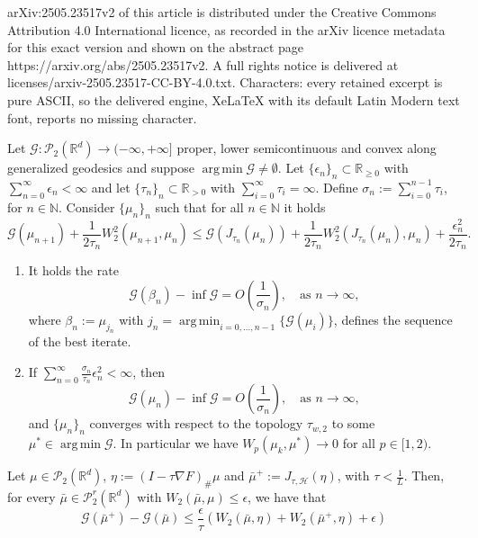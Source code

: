 \documentclass[10pt,a4paper]{amsart}
\DeclareMathOperator*{\argmin}{arg\,min}
\newcommand{\N}{\mathbb{N}}
\newcommand{\RR}{(-\infty,+\infty]}
\newcommand{\R}{\mathbb{R}}
\newcommand{\cG}{\mathcal{G}}
\newcommand{\cP}{\mathcal{P}}
\begin{document}
arXiv:2505.23517v2 of this article is distributed under the Creative Commons Attribution 4.0 International licence, as recorded in the arXiv licence metadata for this exact version and shown on the abstract page https://arxiv.org/abs/2505.23517v2. A full rights notice is delivered at licenses/arxiv-2505.23517-CC-BY-4.0.txt. Characters: every retained excerpt is pure ASCII, so the delivered engine, XeLaTeX with its default Latin Modern text font, reports no missing character.
\begin{theorem}\label{thm:second_error_choice}
	Let $\cG : \cP_2(\R^d) \to \RR $ proper, lower semicontinuous and convex along generalized geodesics and suppose $\argmin \cG \neq \emptyset$. Let $\{\epsilon_n\}_n\subset \mathbb{R}_{\geq 0}$ with $\sum_{n=0}^{\infty} \epsilon_n < \infty$ and let $\{\tau_n\}_n \subset \mathbb{R}_{> 0}$ with $\sum_{i=0}^{\infty}\tau_i= \infty$. Define $\sigma_n:= \sum_{i=0}^{n-1}\tau_i$, for $n\in\mathbb{N}$. Consider $\{\mu_n\}_n$ such that for all $n\in \N$ it holds
	\begin{equation}\label{eq:second_error_condition}
		\cG(\mu_{n+1})+\frac{1}{2{\tau_n}}W_2^2(\mu_{n+1},\mu_n)\leq \cG(J_{\tau_n}(\mu_n))+\frac{1}{2\tau_n}W_2^2(J_{\tau_n}(\mu_n),\mu_n)+ \frac{\epsilon_n^2}{2\tau_n}.
	\end{equation}
	\begin{enumerate}
		\item It holds the rate
		\begin{equation*}
			\cG(\beta_n)-\inf \cG = O\left(\frac{1}{\sigma_n}\right), \quad \text{as } n\to \infty,
		\end{equation*}
		where $\beta_n := \mu_{j_n}$ with $j_n = \argmin_{i=0,\dots,n-1}\{\cG(\mu_i)\}$, defines the sequence of the best iterate.
		\item If $\sum_{n=0}^{\infty}\frac{\sigma_n}{\tau_n}\epsilon_{n}^2  < \infty$, then \[\cG(\mu_n)-\inf \cG = O\left(\frac{1}{\sigma_n}\right), \quad \text{as } n\to \infty,\] and $\{\mu_n\}_n$ converges with respect to the topology $\tau_{w,2}$ to some $\mu^*\in \argmin \cG$. In particular we have $W_p(\mu_k,\mu^*)\to 0$ for all $p\in[1,2)$.
	\end{enumerate}
\end{theorem}

\begin{lemma}\label{lem:second_ingredient_PG}
	Let $\mu \in \cP_2(\R^d)$, $\eta := (I-\tau \nabla F)_{\#}\mu$ and $\bar{\mu}^+:=J_{\tau,\mathcal{H}}(\eta)$, with $\tau < \frac{1}{L}$. Then, for every $\bar \mu \in \cP_2^r(\R^d)$ with $W_2(\bar \mu, \mu)\leq \epsilon$,  we have that
	\begin{equation}\label{eq:lem_second_ingredient_PG}
		\mathcal{G}(\bar \mu^+) - \mathcal{G}(\bar \mu) \leq  \frac{\epsilon}{\tau} (W_2(\bar \mu, \eta)+W_2(\bar \mu^+, \eta)+\epsilon)
	\end{equation}
\end{lemma}
\end{document}
